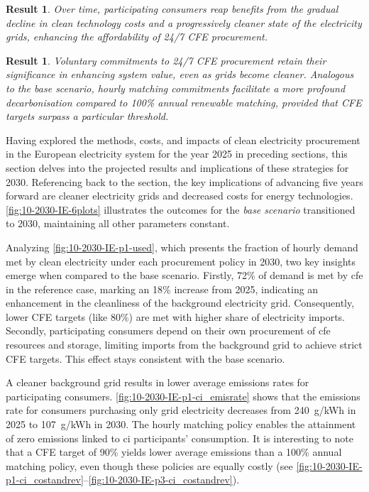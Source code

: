 \documentclass[11pt, 5p, nopreprintline]{elsarticle}
\newcommand{\co}{\ce{CO2}}
\newtheorem{res}[thm]{Result}  %
\begin{document}
\begin{res}
    Over time, participating consumers reap benefits from the gradual decline in clean technology costs and a progressively cleaner state of the electricity grids, enhancing the affordability of 24/7 CFE procurement.
\end{res}

\begin{res}
    Voluntary commitments to 24/7 CFE procurement retain their significance in enhancing system value, even as grids become cleaner. Analogous to the base scenario, hourly matching commitments facilitate a more profound decarbonisation compared to 100\% annual renewable matching, provided that CFE targets surpass a particular threshold.
\end{res}

Having explored the methods, costs, and impacts of clean electricity procurement in the European electricity system for the year 2025 in preceding sections, this section delves into the projected results and implications of these strategies for 2030.
Referencing back to the  section, the key implications of advancing five years forward are cleaner electricity grids and decreased costs for energy  technologies. \cref{fig:10-2030-IE-6plots} illustrates the outcomes for the \textit{base scenario} transitioned to 2030, maintaining all other parameters constant.

Analyzing \cref{fig:10-2030-IE-p1-used}, which presents the fraction of hourly demand met by clean electricity under each procurement policy in 2030, two key insights emerge when compared to the base scenario.
Firstly, 72\% of demand is met by \gls{cfe} in the reference case, marking an 18\% increase from 2025, indicating an enhancement in the cleanliness of the background electricity grid.
Consequently, lower CFE targets (like 80\%) are met with higher share of electricity imports.
Secondly, participating consumers depend on their own procurement of \gls{cfe} resources and storage, limiting imports from the background grid to achieve strict CFE targets.
This effect stays consistent with the base scenario.

A cleaner background grid results in lower average emissions rates for participating consumers.
\cref{fig:10-2030-IE-p1-ci_emisrate} shows that the emissions rate for consumers purchasing only grid electricity decreases from 240~g\co/kWh in 2025 to 107~g\co/kWh in 2030.
The hourly matching policy enables the attainment of zero emissions linked to \gls{ci} participants' consumption.
It is interesting to note that a CFE target of 90\% yields lower average emissions than a 100\% annual matching policy, even though these policies are equally costly (see \cref{fig:10-2030-IE-p1-ci_costandrev}--\cref{fig:10-2030-IE-p3-ci_costandrev}).
\end{document}
